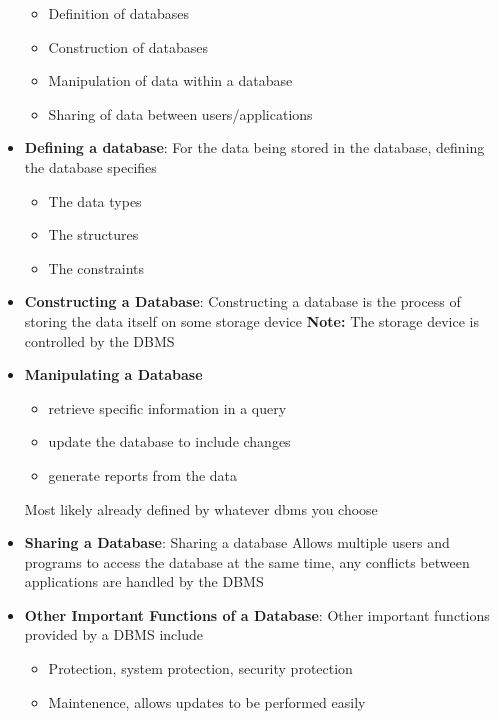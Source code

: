 \documentclass{report}
\begin{document}
\begin{itemize}
            \begin{itemize}
                \item Definition of databases
                \item Construction of databases
                \item Manipulation of data within a database
                \item Sharing of data between users/applications
            \end{itemize}
        \item \textbf{Defining a database}: For the data being stored in the database, defining the database specifies
            \begin{itemize}
                \item The data types
                \item The structures
                \item The constraints
            \end{itemize}
        \item \textbf{Constructing a Database}: Constructing a database is the process of storing the data itself on some storage device
            \bigbreak \noindent 
            \textbf{Note:} The storage device is controlled by the DBMS
        \item \textbf{Manipulating a Database}
            \begin{itemize}
                \item retrieve specific information in a query
                \item update the database to include changes
                \item generate reports from the data
            \end{itemize}
            \bigbreak \noindent 
            Most likely already defined by whatever dbms you choose
        \item \textbf{Sharing a Database}: Sharing a database Allows multiple users and programs to access the database at the same time, any conflicts between applications are handled by the DBMS
        \item \textbf{Other Important Functions of a Database}: Other important functions provided by a DBMS include
            \begin{itemize}
                \item Protection, system protection, security protection
                \item Maintenence, allows updates to be performed easily

\end{itemize}
\end{itemize}
\end{document}
